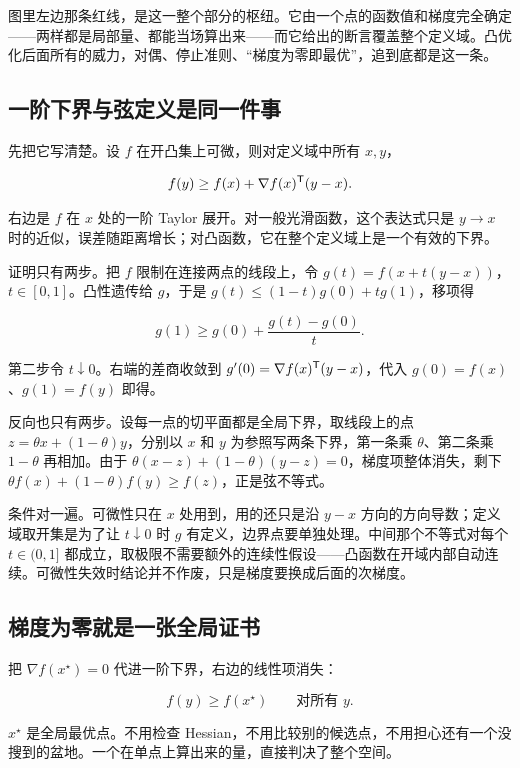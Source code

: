 图里左边那条红线，是这一整个部分的枢纽。它由一个点的函数值和梯度完全确定——两样都是局部量、都能当场算出来——而它给出的断言覆盖整个定义域。凸优化后面所有的威力，对偶、停止准则、``梯度为零即最优''，追到底都是这一条。

\subsection{一阶下界与弦定义是同一件事}

先把它写清楚。设 \(f\) 在开凸集上可微，则对定义域中所有 \(x,y\)，

\[
f(y)\ge f(x)+\nabla f(x)^{\mathsf{T}}(y-x).
\]

右边是 \(f\) 在 \(x\) 处的一阶 Taylor 展开。对一般光滑函数，这个表达式只是 \(y\to x\) 时的近似，误差随距离增长；对凸函数，它在整个定义域上是一个有效的下界。

证明只有两步。把 \(f\) 限制在连接两点的线段上，令 \(g(t)=f(x+t(y-x))\)，\(t\in[0,1]\)。凸性遗传给 \(g\)，于是 \(g(t)\le(1-t)g(0)+tg(1)\)，移项得

\[
g(1)\ge g(0)+\frac{g(t)-g(0)}{t}.
\]

第二步令 \(t\downarrow0\)。右端的差商收敛到 \(g'(0)=\nabla f(x)^{\mathsf{T}}(y-x)\)，代入 \(g(0)=f(x)\)、\(g(1)=f(y)\) 即得。

反向也只有两步。设每一点的切平面都是全局下界，取线段上的点 \(z=\theta x+(1-\theta)y\)，分别以 \(x\) 和 \(y\) 为参照写两条下界，第一条乘 \(\theta\)、第二条乘 \(1-\theta\) 再相加。由于 \(\theta(x-z)+(1-\theta)(y-z)=0\)，梯度项整体消失，剩下 \(\theta f(x)+(1-\theta)f(y)\ge f(z)\)，正是弦不等式。

条件对一遍。可微性只在 \(x\) 处用到，用的还只是沿 \(y-x\) 方向的方向导数；定义域取开集是为了让 \(t\downarrow0\) 时 \(g\) 有定义，边界点要单独处理。中间那个不等式对每个 \(t\in(0,1]\) 都成立，取极限不需要额外的连续性假设——凸函数在开域内部自动连续。可微性失效时结论并不作废，只是梯度要换成后面的次梯度。

\subsection{梯度为零就是一张全局证书}

把 \(\nabla f(x^\star)=0\) 代进一阶下界，右边的线性项消失：

\[
f(y)\ge f(x^\star)\qquad\text{对所有 }y.
\]

\(x^\star\) 是全局最优点。不用检查 Hessian，不用比较别的候选点，不用担心还有一个没搜到的盆地。一个在单点上算出来的量，直接判决了整个空间。

